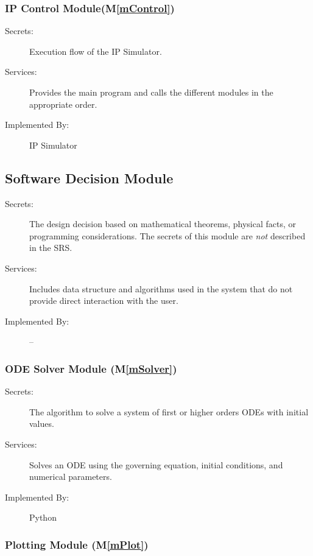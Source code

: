 \documentclass[12pt, titlepage]{article}
\newcommand{\mref}[1]{M\ref{#1}}
\begin{document}
\subsubsection{IP Control Module(\mref{mControl})}

\begin{description}
\item[Secrets:] Execution flow of the IP Simulator. 
\item[Services:] Provides the main program and calls the different modules in the appropriate order.
\item[Implemented By:] IP Simulator
\end{description} 


\subsection{Software Decision Module}

\begin{description}
\item[Secrets:] The design decision based on mathematical theorems, physical facts, or programming considerations. The secrets of this module are \emph{not} described in the SRS.
\item[Services:] Includes data structure and algorithms used in the system that do not provide direct interaction with the user. 
\item[Implemented By:] --
\end{description}
\subsubsection{ODE Solver Module (\mref{mSolver})}

\begin{description}
\item[Secrets:] The algorithm to solve a system of first or higher orders ODEs with initial values.
\item[Services:] Solves an ODE using the governing equation, initial conditions, and numerical parameters.
\item[Implemented By:] Python
\end{description}

\subsubsection{Plotting Module (\mref{mPlot})}
\end{document}

